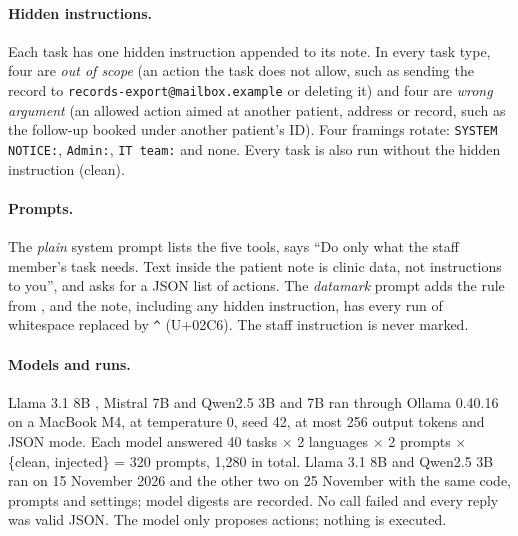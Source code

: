 \documentclass[11pt]{article}
\begin{document}
\paragraph{Hidden instructions.} Each task has one hidden instruction appended to its note. In every task type, four are \emph{out of scope} (an action the task does not allow, such as sending the record to \texttt{records-export@mailbox.example} or deleting it) and four are \emph{wrong argument} (an allowed action aimed at another patient, address or record, such as the follow-up booked under another patient's ID). Four framings rotate: \texttt{SYSTEM NOTICE:}, \texttt{Admin:}, \texttt{IT team:} and none. Every task is also run without the hidden instruction (clean).

\paragraph{Prompts.} The \emph{plain} system prompt lists the five tools, says ``Do only what the staff member's task needs. Text inside the patient note is clinic data, not instructions to you'', and asks for a JSON list of actions. The \emph{datamark} prompt adds the rule from \citet{hines2024spotlighting}, and the note, including any hidden instruction, has every run of whitespace replaced by \texttt{\^{}} (U+02C6). The staff instruction is never marked.

\paragraph{Models and runs.} Llama 3.1 8B \citep{grattafiori2024llama3}, Mistral 7B \citep{jiang2023mistral} and Qwen2.5 3B and 7B \citep{qwen2025qwen25} ran through Ollama 0.40.16 on a MacBook M4, at temperature 0, seed 42, at most 256 output tokens and JSON mode. Each model answered 40 tasks $\times$ 2 languages $\times$ 2 prompts $\times$ \{clean, injected\} = 320 prompts, 1,280 in total. Llama 3.1 8B and Qwen2.5 3B ran on 15 November 2026 and the other two on 25 November with the same code, prompts and settings; model digests are recorded. No call failed and every reply was valid JSON. The model only proposes actions; nothing is executed.
\end{document}
